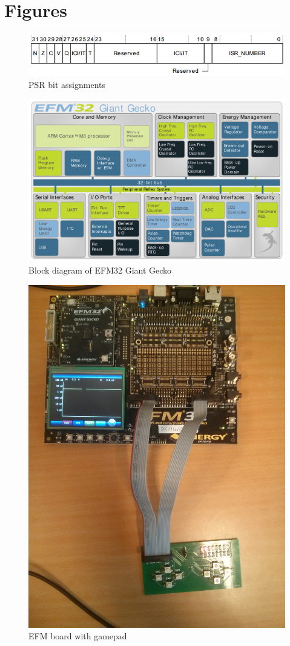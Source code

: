 \chapter{Figures}

\begin{figure}[ht]
 \centering
 \includegraphics[width=\textwidth]{images/psr_map.png}
 \caption{PSR bit assignments}
 \label{fig:PSRMap}
\end{figure}

\begin{figure}[ht]
 \centering
 \includegraphics[width=\textwidth]{images/giant_gecko_map.png}
 \caption{Block diagram of EFM32 Giant Gecko}
 \label{fig:GiantGeckoMap}
\end{figure}

\begin{figure}[ht]
 \centering
 \includegraphics[width=\textwidth]{images/efm_board.jpg}
 \caption{EFM board with gamepad}
 \label{fig:EFMBoard}
\end{figure}
